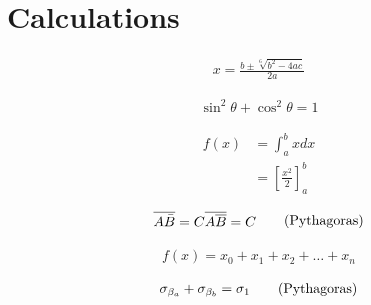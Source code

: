 \section{Calculations}

\begin{equation}
    \begin{split}
        
        x=\frac{b\pm \sqrt[6]{b^2 - 4ac}}{2a}
    \end{split}
    \tag{Pythagoras}
    \label{eqn1}
\end{equation}

\begin{equation}
    \begin{split}
        
       \sin^2{\theta} + \cos^2{\theta} = 1
    \end{split}
    \tag{Pythagoras}
    \label{eqnl}
\end{equation}

\begin{equation}
    \begin{split}
        f(x) &= \int_a^b xdx \\
            &= \left[    \frac{x^2}{2} \right]_a^b
    \end{split}
    \tag{Pythagoras}
    \label{eqnl}
\end{equation}

\begin{equation}
    \begin{split}
        \overline{A \Bar{B}} = C
        \overline{A \overline{B}} = C
    \end{split}
    \tag{Pythagoras}
    \label{eqnl}
\end{equation}

\begin{equation}
    \begin{split}
        f(x) = x_0 + x_1 + x_2 + \dots +x_n
    \end{split}
    \tag{Pythagoras}
    \label{eqnl}
\end{equation}

\begin{equation}
    \begin{split}
        \sigma_{\beta_a} + \sigma_{\beta_b} = \sigma_{1}
    \end{split}
    \tag{Pythagoras}
    \label{eqnl}
\end{equation}

